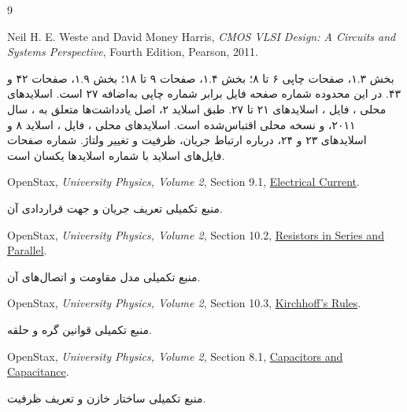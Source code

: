 \documentclass[12pt,a4paper]{article}
\newcommand{\secnum}[1]{\mbox{\beginL#1\endL}}
\begin{document}
\tableofcontents
\clearpage



\begin{thebibliography}{9}
\begin{latin}
Neil H. E. Weste and David Money Harris,
\textit{CMOS VLSI Design: A Circuits and Systems Perspective}, Fourth Edition,
Pearson, 2011.
\end{latin}
بخش \secnum{۱.۳}، صفحات چاپی ۶ تا ۸؛ بخش \secnum{۱.۴}، صفحات ۹ تا ۱۸؛
بخش \secnum{۱.۹}، صفحات ۴۲ و ۴۳. در این محدوده شماره صفحه فایل
 برابر شماره چاپی به‌اضافه ۲۷ است.
اسلایدهای محلی ، فایل ،
اسلایدهای ۲۱ تا ۲۷. طبق اسلاید ۲، اصل یادداشت‌ها متعلق به
، سال ۲۰۱۱، و نسخه محلی اقتباس‌شده است.
اسلایدهای محلی ، فایل ،
اسلاید ۸ و اسلایدهای ۲۳ و ۲۴، درباره ارتباط جریان، ظرفیت و تغییر ولتاژ.
شماره صفحات فایل‌های اسلاید با شماره اسلایدها یکسان است.
\begin{latin}
OpenStax, \textit{University Physics, Volume 2}, Section 9.1,
\href{https://openstax.org/books/university-physics-volume-2/pages/9-1-electrical-current}{Electrical Current}.
\end{latin}
منبع تکمیلی تعریف جریان و جهت قراردادی آن.
\begin{latin}
OpenStax, \textit{University Physics, Volume 2}, Section 10.2,
\href{https://openstax.org/books/university-physics-volume-2/pages/10-2-resistors-in-series-and-parallel}{Resistors in Series and Parallel}.
\end{latin}
منبع تکمیلی مدل مقاومت و اتصال‌های آن.
\begin{latin}
OpenStax, \textit{University Physics, Volume 2}, Section 10.3,
\href{https://openstax.org/books/university-physics-volume-2/pages/10-3-kirchhoffs-rules}{Kirchhoff's Rules}.
\end{latin}
منبع تکمیلی قوانین گره و حلقه.
\begin{latin}
OpenStax, \textit{University Physics, Volume 2}, Section 8.1,
\href{https://openstax.org/books/university-physics-volume-2/pages/8-1-capacitors-and-capacitance}{Capacitors and Capacitance}.
\end{latin}
منبع تکمیلی ساختار خازن و تعریف ظرفیت.
\end{thebibliography}
\end{document}
